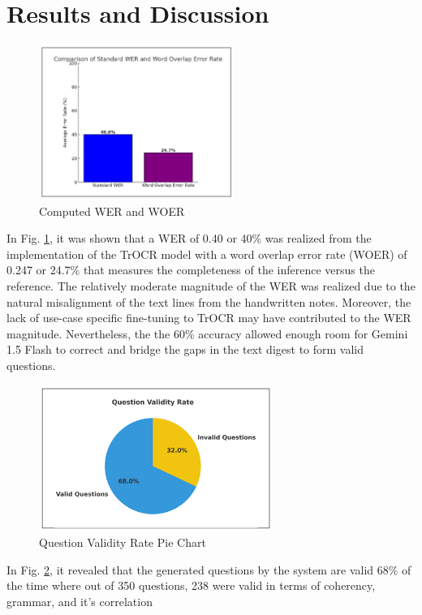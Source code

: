 \documentclass[conference]{IEEEtran}
\begin{document}
\section{Results and Discussion}
\begin{figure}[H]
    \centerline{\includegraphics[width=2.5in]{wer.png}}
    \vspace{-0.4cm}
    \caption{Computed WER and WOER} 
    \label{wer}
    \end{figure}
\indent In Fig. \ref{wer}, it was shown that a WER of 0.40 or 40\% 
was realized from the implementation of the TrOCR model with a 
word overlap error rate (WOER) of 0.247 or 24.7\% that 
measures the completeness of the inference versus the reference.
The relatively moderate magnitude of the WER was realized due to the 
natural misalignment of the text lines from the handwritten notes. 
Moreover, the lack of use-case specific fine-tuning to TrOCR 
may have contributed to the WER magnitude. Nevertheless, the
the 60\% accuracy allowed enough room for Gemini 1.5 Flash to correct 
and bridge the gaps in the text digest to form valid questions.
\begin{figure}[H]
    \centerline{\includegraphics[width=3in]{validity.png}}
    \vspace{-0.3cm}
    \caption{Question Validity Rate Pie Chart} 
    \label{validity}
    \end{figure}
\indent In Fig. \ref{validity}, it revealed that the generated questions 
by the system are valid 68\% of the time where out of 350 questions, 
238 were valid in terms of coherency, grammar, and it's correlation 
\end{document}
